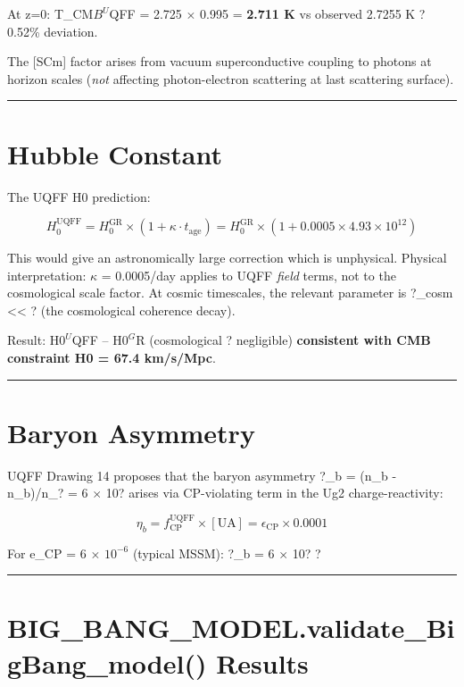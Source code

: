 \documentclass[12pt,a4paper]{article}
\begin{document}
At z=0: T\_CM$B^{U}$QFF = 2.725 $\times$ 0.995 = \textbf{2.711 K} vs observed 2.7255 K ? 0.52\% deviation.

The [SCm] factor arises from vacuum superconductive coupling to photons at horizon scales (\emph{not} affecting photon-electron scattering at last scattering surface).

\medskip\hrule\medskip

\section{Hubble Constant}

The UQFF H0 prediction:

\begin{equation}
H_0^{\mathrm{UQFF}} = H_0^{\mathrm{GR}} \times (1 + \kappa \cdot t_{\mathrm{age}}) = H_0^{\mathrm{GR}} \times (1 + 0.0005 \times 4.93 \times 10^{12})
\end{equation}

This would give an astronomically large correction  which is unphysical. Physical interpretation: $\kappa$ = 0.0005/day applies to UQFF \emph{field} terms, not to the cosmological scale factor. At cosmic timescales, the relevant parameter is ?\_cosm << ? (the cosmological coherence decay).

Result: H$0^{U}$QFF -- H$0^{G}$R (cosmological ? negligible)  \textbf{consistent with CMB constraint H0 = 67.4 km/s/Mpc}.

\medskip\hrule\medskip

\section{Baryon Asymmetry}

UQFF Drawing 14 proposes that the baryon asymmetry ?\_b = (n\_b - n\_b)/n\_? = 6 $\times$ 10? arises via CP-violating term in the Ug2 charge-reactivity:

\begin{equation}
\eta_b = f_{\mathrm{CP}}^{\mathrm{UQFF}} \times [{\mathrm{UA}}] = \epsilon_{\mathrm{CP}} \times 0.0001
\end{equation}

For e\_CP = 6 $\times$ $10^{-6}$ (typical MSSM): ?\_b = 6 $\times$ 10? ?

\medskip\hrule\medskip

\section{BIG\_{BANG\_MODEL}.validate\_{BigBang\_model}() Results}
\end{document}
